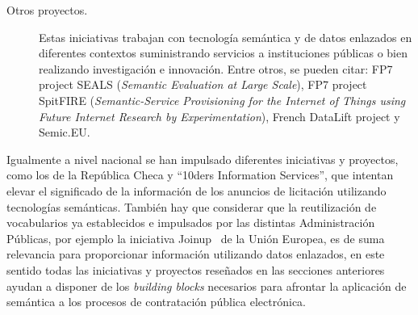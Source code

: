 \begin{description}
\item [Otros proyectos.] Estas iniciativas trabajan con tecnología semántica y de datos enlazados en diferentes contextos suministrando servicios
a instituciones públicas o bien realizando investigación e innovación. Entre otros, se pueden citar: \gls{FP7} project SEALS (\textit{Semantic Evaluation at Large Scale}), FP7 project SpitFIRE (\textit{Semantic-Service Provisioning for the Internet of Things using Future Internet Research 
by Experimentation}), French DataLift project y Semic.EU.
\end{description}

Igualmente a nivel nacional se han impulsado diferentes iniciativas
y proyectos, como los de la República Checa y ``10ders Information Services'', que intentan elevar el significado de la información
de los anuncios de licitación utilizando tecnologías semánticas. También hay que considerar que la reutilización
de vocabularios ya establecidos e impulsados por las distintas Administración Públicas, por ejemplo la iniciativa Joinup~\cite{joinup-europe} de la Unión Europea, 
es de suma relevancia para proporcionar información utilizando datos enlazados, en este sentido todas las iniciativas y proyectos reseñados en las secciones anteriores ayudan a 
disponer de los \textit{building blocks} necesarios para afrontar la aplicación de semántica a los procesos de contratación pública electrónica.

